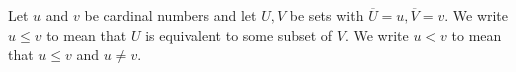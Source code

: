 Let \(u\) and \(v\) be cardinal numbers and let \(U, V\) be sets with \(\overline{U} = u, \overline{V} = v\). We write \(u \leq v\) to mean that \(U\) is equivalent to some subset of \(V\). We write \(u < v\) to mean that \(u \leq v\) and \(u \neq v\).